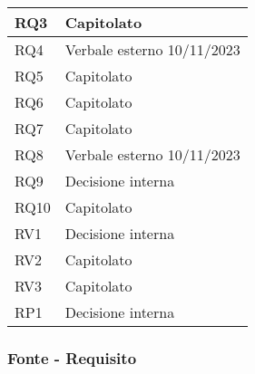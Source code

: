 \begin{center}
\begin{longtable}{|C{5cm}|C{5cm}|}
        \hline
        RQ3 & Capitolato \\
        \hline
        RQ4 & Verbale esterno 10/11/2023 \\
        \hline
        RQ5 & Capitolato \\
        \hline
        RQ6 & Capitolato \\
        \hline
        RQ7 & Capitolato \\
        \hline
        RQ8 & Verbale esterno 10/11/2023 \\
        \hline
        RQ9 & Decisione interna \\
        \hline
        RQ10 & Capitolato \\
        \hline
        RV1 & Decisione interna \\
        \hline
        RV2 & Capitolato \\
        \hline
        RV3 & Capitolato \\
        \hline
        \hline
        RP1 & Decisione interna \\
        \hline
    \end{longtable}
\end{center}

\subsubsection{Fonte - Requisito}

